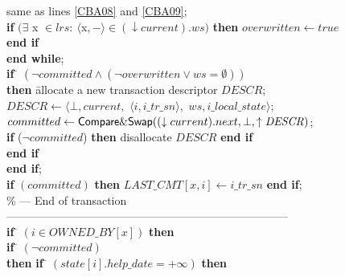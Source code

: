 \begin{figure}[h!]
{{\begin{minipage}[t]{150mm}
\begin{tabbing}
 \> \>\> same as lines \ref{CBA08} and  \ref{CBA09};\\


 \> \> \> {\bf if} 
    $(\exists$ {\sc x} $\in \mathit{lrs}:
               ~ \langle${\sc x}$,-\rangle \in (\downarrow current).ws)$
    {\bf then}  $overwritten  \leftarrow \mathit{true}$  {\bf end if} \\


 \>\>  {\bf end while};\\


 \>\>  {\bf if} \= $(\neg committed \wedge
                    ( \neg overwritten \vee ws=\emptyset))$\\


 \>  \>\> {\bf then} \=
   allocate a new transaction descriptor $\mathit{DESCR}$;\\


 \> \> \>\> $\mathit{DESCR} \leftarrow   
\langle  \bot, current,$ $\langle i, i\_tr\_sn \rangle,$ 
                       $ws,i\_local\_state \rangle$;\\
 

 \> \> \>\> $committed \leftarrow 
 {\sf Compare\&Swap}((\downarrow current).next, 
                     \bot,\uparrow \mathit{DESCR})$;\\


 \> \> \>\> {\bf if} ($\neg committed$) 
   {\bf then} disallocate  $\mathit{DESCR}$ {\bf end if}\\



 \> \> {\bf end if}\\

 \> {\bf end if};\\

 \> {\bf if} $(committed)$  {\bf then}
            $\mathit{LAST\_CMT}[x,i] \leftarrow i\_tr\_sn$  {\bf end if};\\

\>\> \% --- End of transaction --------------------------------------------------------------------------- \\


 \> {\bf if} \= $(i\in \mathit{OWNED\_BY}[x])$  {\bf then} \\


 \> \>  {\bf if} \= $(\neg committed)$ \\

 \> \> \> 
     {\bf then} \= {\bf if} \= $(state[i].help\_date =+\infty)$ {\bf then} \\


\end{tabbing}
\end{minipage}}}
\end{figure}
